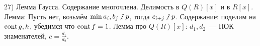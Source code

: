 27) Лемма Гаусса. Содержание многочлена. Делимость в $Q(R)[x]$ и в $R[x]$.\\
Лемма: Пусть нет, возьмём $\min a_i, b_j \ndi p$, тогда $c_{i + j} \ndi p$. Содержание: поделим на $\operatorname{cont} g, h$, убедимся что $\operatorname{cont} f = 1$. Лемма про $Q(R)[x]$: $d_1, d_2$~--- НОК знаменателей, $c = \frac{d_1}{d_2}$.\\
